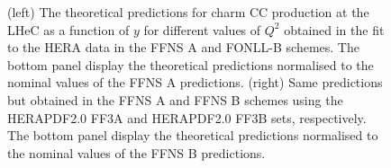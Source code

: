 \documentclass[pdftex,twocolumn,epjc3]{svjour3}          %
\newcommand{\fonll} {{FONLL-B}\xspace}
\newcommand{\ffns} {{FFNS A}\xspace}
\newcommand{\ffnsb} {{FFNS B}\xspace}
\newcommand{\ffthreea} {{HERAPDF2.0 FF3A}\xspace}
\newcommand{\ffthreeb} {{HERAPDF2.0 FF3B}\xspace}
\begin{document}
\begin{figure}
    \centering
    \caption{(left) The theoretical predictions for charm CC production at the LHeC as a function of $y$ for different values of $Q^2$ obtained in the fit to the HERA data in the \ffns and \fonll schemes. The bottom panel display the theoretical predictions normalised to the nominal values of the \ffns predictions. (right) Same predictions but obtained in the \ffns and \ffnsb schemes using the \ffthreea and \ffthreeb sets, respectively. The bottom panel display the theoretical predictions normalised to the nominal values of the \ffnsb predictions.}
    \label{fig:thpred-fit-y}
\end{figure}
\end{document}
